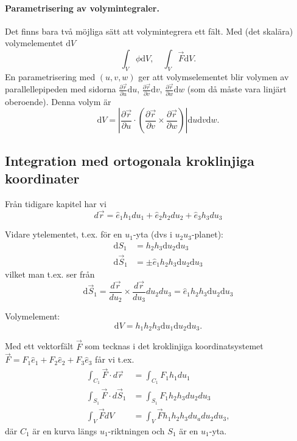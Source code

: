 \documentclass[%
oneside,                 %
final,                   %
10pt]{article}
\begin{document}
\paragraph{Parametrisering av volymintegraler.}
Det finns bara två möjliga sätt att volymintegrera ett fält. Med (det skalära) volymelementet $\mbox{d}V$
\begin{equation}
\int_V \phi \mbox{d}V,\quad \int_V \vec{F} \mbox{d}V.
\end{equation}
En parametrisering med $(u,v,w)$ ger att volymselementet blir volymen av parallellepipeden med sidorna $\frac{\partial \vec{r}}{\partial u} \mbox{d}u$, $\frac{\partial \vec{r}}{\partial v} \mbox{d}v$, $\frac{\partial \vec{r}}{\partial w} \mbox{d}w$ (som då måste vara linjärt oberoende). Denna volym är
\begin{equation}
\mbox{d}V = \left| \frac{\partial \vec{r}}{\partial u} \cdot \left( \frac{\partial \vec{r}}{\partial v} \times \frac{\partial \vec{r}}{\partial w} \right) \right| \mbox{d}u \mbox{d}v \mbox{d}w.
\end{equation}

\subsection{Integration med ortogonala kroklinjiga koordinater}

Från tidigare kapitel har vi 
\begin{equation}
d\vec{r} = \hat{e}_1 h_1 du_1 + \hat{e}_2 h_2 du_2 + \hat{e}_3 h_3 du_3
\end{equation}

Vidare ytelementet, t.ex. för en $u_1$-yta (dvs i $u_2 u_3$-planet):
\begin{align}
\mbox{d} S_1 &= h_2 h_3 \mbox{d}u_2 \mbox{d}u_3 \\
\mbox{d} \vec{S}_1 &= \pm \hat{e}_1 h_2 h_3 \mbox{d}u_2 \mbox{d}u_3 
\end{align}
vilket man t.ex. ser från 
\begin{equation}
\mbox{d} \vec{S}_1 = \frac{d\vec{r}}{du_2} \times \frac{d\vec{r}}{du_3} du_2 du_3
= \hat{e}_1 h_2 h_3 \mbox{d}u_2 \mbox{d}u_3 
\end{equation}

Volymelement:
\begin{equation}
\mbox{d} V = h_1 h_2 h_3 \mbox{d}u_1 \mbox{d}u_2 \mbox{d}u_3.
\end{equation}

Med ett vektorfält $\vec{F}$ som tecknas i det kroklinjiga koordinatsystemet $\vec{F} = F_1 \hat{e}_1 + F_2 \hat{e}_2 + F_3 \hat{e}_3$ får vi t.ex.
\begin{align}
\int_{C_1} \vec{F} \cdot d\vec{r} &= \int_{C_1} F_1 h_1 du_1 \\
\int_{S_1} \vec{F} \cdot d\vec{S}_1 &= \int_{S_1} F_1 h_2 h_3 du_2 du_3 \\
\int_V \vec{F} dV &= \int_V \vec{F} h_1 h_2 h_3 du_a du_2 du_3,
\end{align}
där $C_1$ är en kurva längs $u_1$-riktningen och $S_1$ är en $u_1$-yta.
\end{document}
